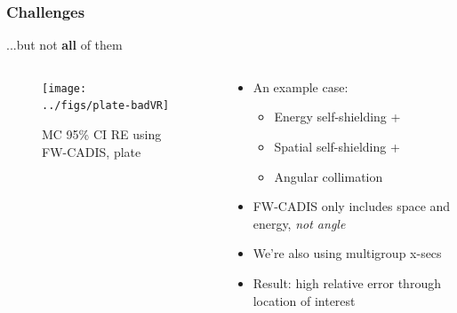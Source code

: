 \documentclass[xcolor=x11names,compress]{beamer}
\renewcommand{\(}{\begin{columns}}
\renewcommand{\)}{\end{columns}}
\newcommand{\<}[1]{\begin{column}{#1}}
\renewcommand{\>}{\end{column}}
\begin{document}
\begin{frame}[fragile]
  \frametitle{Challenges}

	...but not \textbf{all} of them
	\begin{columns}
  	\begin{column}{0.45\textwidth}
  	\begin{center}
  	\begin{figure}
  		\texttt{[image: ../figs/plate-badVR]}
  		\caption{MC 95\% CI RE using FW-CADIS, plate \cite{Wilson2015}}
  	\end{figure}
	\end{center}
  	\end{column}
 	\begin{column}{0.5\textwidth}
  	\begin{center}
  	\begin{itemize}
  		\item An example case: 
		\begin{itemize}
		    \item Energy self-shielding + 
		    \item Spatial self-shielding +
		    \item Angular collimation
		\end{itemize}
		\item FW-CADIS only includes space and energy, \textit{not angle} \vspace*{0.5 em}
		\item We're also using multigroup x-secs
		\pause
	    \item Result: high relative error through location of interest \vspace*{0.5 em}
	\end{itemize}
  	\end{center}
  	\end{column}
	\end{columns}

\end{frame}
\end{document}
